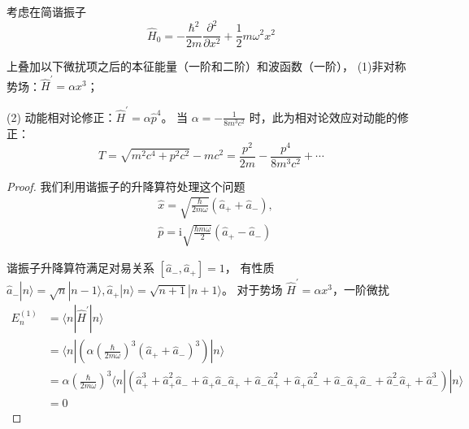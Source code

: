 \begin{1}
    考虑在简谐振子
$$\hat{H}_{0}=-\frac{\hbar^{2}}{2m} \frac{\partial^{2}}{\partial x^{2}}
+\frac{1}{2} m \omega^{2} x^{2}$$

上叠加以下微扰项之后的本征能量（一阶和二阶）和波函数（一阶），
(1)非对称势场：$\hat{H}^{\prime}=\alpha x^{3}$；

(2) 动能相对论修正：$\hat{H}^{\prime}=\alpha \hat{p}^{4}$。
当 $\alpha=-\frac{1}{8 m^{3} c^{2}}$ 时，此为相对论效应对动能的修正：
$$T=\sqrt{m^{2} c^{4}+p^{2} c^{2}}-m c^{2}
=\frac{p^{2}}{2m}-\frac{p^{4}}{8 m^{3} c^{2}}+\cdots$$ 
\end{1}
\begin{proof}
    我们利用谐振子的升降算符处理这个问题
$$\begin{aligned}
& \hat{x}=\sqrt{\frac{\hbar}{2 m \omega}}\left(\hat{a}_{+}+\hat{a}_{-}\right), \\
& \hat{p}=\mathrm{i} \sqrt{\frac{\hbar m \omega}{2}}\left(\hat{a}_{+}-\hat{a}_{-}\right)
\end{aligned}$$

谐振子升降算符满足对易关系 $\left[\hat{a}_{-}, \hat{a}_{+}\right]=1$，
有性质 $\hat{a}_{-}|n\rangle=\sqrt{n}|n-1\rangle, \hat{a}_{+}|n\rangle=\sqrt{n+1}|n+1\rangle$。
对于势场 $\hat{H}^{\prime}=\alpha x^{3}$，一阶微扰
$$\begin{aligned}
E_{n}^{(1)} & =\langle n| \hat{H}^{\prime}|n\rangle \\
& =\langle n|\left(\alpha\left(\frac{\hbar}{2 m \omega}\right)^{3}\left(\hat{a}_{+}+\hat{a}_{-}\right)^{3}\right)|n\rangle \\
& =\alpha\left(\frac{\hbar}{2 m \omega}\right)^{3}\langle n|\left(\hat{a}_{+}^{3}+\hat{a}_{+}^{2} \hat{a}_{-}+\hat{a}_{+} \hat{a}_{-} \hat{a}_{+}+\hat{a}_{-} \hat{a}_{+}^{2}+\hat{a}_{+} \hat{a}_{-}^{2}+\hat{a}_{-} \hat{a}_{+} \hat{a}_{-}+\hat{a}_{-}^{2} \hat{a}_{+}+\hat{a}_{-}^{3}\right)|n\rangle \\
& =0
\end{aligned}$$


\end{proof}
